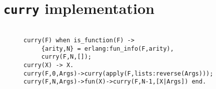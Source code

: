 \chapter{\texttt{curry} implementation} \label{app:curry}


\lstset{basicstyle=\ttfamily\scriptsize}


\begin{figure}[!htb]
\centering
\begin{lstlisting} 

curry(F) when is_function(F) ->
	 {arity,N} = erlang:fun_info(F,arity),
	 curry(F,N,[]);
curry(X) -> X.
curry(F,0,Args)->curry(apply(F,lists:reverse(Args)));
curry(F,N,Args)->fun(X)->curry(F,N-1,[X|Args]) end.

\end{lstlisting}
\end{figure}